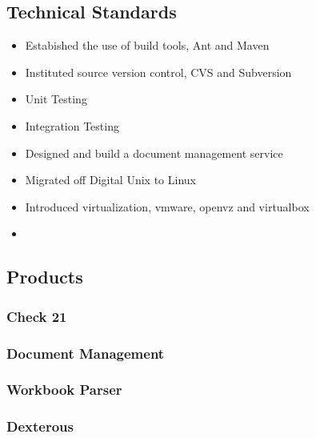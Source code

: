 \documentclass[letterpaper,10pt,english]{sphinxmanual}
\begin{document}
\subsection{Technical Standards}
\label{\detokenize{Contributions:technical-standards}}\begin{itemize}
\item {} 
Estabished the use of build tools, Ant and Maven

\item {} 
Instituted source version control, CVS and Subversion

\item {} 
Unit Testing

\item {} 
Integration Testing

\item {} 
Designed and build a document management service

\item {} 
Migrated off Digital Unix to Linux

\item {} 
Introduced virtualization, vmware, openvz and virtualbox

\item {} 
\end{itemize}


\subsection{Products}
\label{\detokenize{Contributions:products}}

\subsubsection{Check 21}
\label{\detokenize{Contributions:check-21}}

\subsubsection{Document Management}
\label{\detokenize{Contributions:document-management}}

\subsubsection{Workbook Parser}
\label{\detokenize{Contributions:workbook-parser}}

\subsubsection{Dexterous}
\label{\detokenize{Contributions:dexterous}}
\end{document}
